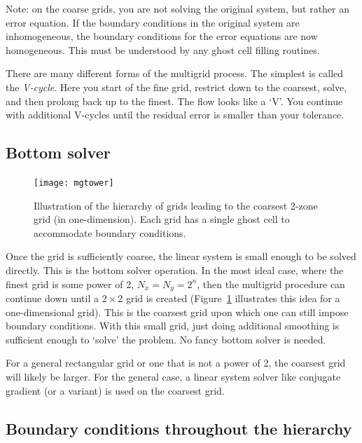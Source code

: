 Note: on the coarse grids, you are not solving the original system,
but rather an error equation.  If the boundary conditions in the
original system are inhomogeneous, the boundary conditions for the
error equations are now homogeneous.  This must be understood by
any ghost cell filling routines.

There are many different forms of the multigrid process.  The simplest 
is called the {\em V-cycle}.  Here you start of the fine grid, restrict
down to the coarsest, solve, and then prolong back up to the finest. 
The flow looks like a `V'.  You continue with additional V-cycles
until the residual error is smaller than your tolerance.



\subsection{Bottom solver}

\begin{figure}[t]
\centering
\texttt{[image: mgtower]}
\caption[A multigrid hierarchy]{\label{fig:mgtower} Illustration of
  the hierarchy of grids leading to the coarsest 2-zone grid (in
  one-dimension).  Each grid has a single ghost cell to accommodate
  boundary conditions.}
\end{figure}

Once the grid is sufficiently coarse, the linear system is small
enough to be solved directly.  This is the bottom solver operation.
In the most ideal case, where the finest grid is some power of 2, $N_x
= N_y = 2^n$, then the multigrid procedure can continue down until a
$2\times 2$ grid is created (Figure~\ref{fig:mgtower} illustrates this idea
for a one-dimensional grid).  This is the coarsest grid upon which one
can still impose boundary conditions.  With this small grid, just
doing additional smoothing is sufficient enough to `solve' the
problem.  No fancy bottom solver is needed.

For a general rectangular grid or one that is not a power of 2, the
coarsest grid will likely be larger.  For the general case, a linear
system solver like conjugate gradient (or a variant) is used on the
coarsest grid.

\subsection{Boundary conditions throughout the hierarchy}

